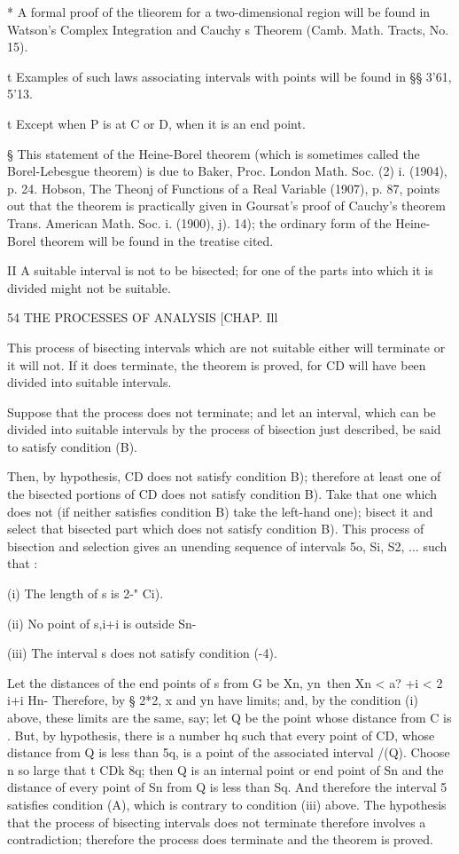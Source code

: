 * A formal proof of the tlieorem for a two-dimensional region will be
found in Watson's Complex Integration and Cauchy s Theorem (Camb.
Math. Tracts, No. 15).

t Examples of such laws associating intervals with points will be
found in §§ 3'61, 5'13.

t Except when P is at C or D, when it is an end point.

§ This statement of the Heine-Borel theorem (which is sometimes called
the Borel-Lebesgue theorem) is due to Baker, Proc. London Math. Soc.
(2) i. (1904), p. 24. Hobson, The Theonj of Functions of a Real
Variable (1907), p. 87, points out that the theorem is practically
given in Goursat's proof of Cauchy's theorem Trans. American Math.
Soc. i. (1900), j). 14); the ordinary form of the Heine-Borel theorem
will be found in the treatise cited.

II A suitable interval is not to be bisected; for one of the parts
into which it is divided might not be suitable.



54 THE PROCESSES OF ANALYSIS [CHAP. Ill

This process of bisecting intervals which are not suitable either will
terminate or it will not. If it does terminate, the theorem is proved,
for CD will have been divided into suitable intervals.

Suppose that the process does not terminate; and let an interval,
which can be divided into suitable intervals by the process of
bisection just described, be said to satisfy condition (B).

Then, by hypothesis, CD does not satisfy condition B); therefore at
least one of the bisected portions of CD does not satisfy condition
B). Take that one which does not (if neither satisfies condition B)
take the left-hand one); bisect it and select that bisected part
which does not satisfy condition B). This process of bisection and
selection gives an unending sequence of intervals 5o, Si, S2, ... such
that :

(i) The length of s is 2-" Ci).

(ii) No point of s,i+i is outside Sn-

(iii) The interval s does not satisfy condition (-4).

Let the distances of the end points of s from G be Xn, yn\ then Xn <
a? +i < 2 i+i Hn- Therefore, by § 2*2, x and yn have limits; and, by
the condition (i) above, these limits are the same, say; let Q be the
point whose distance from C is . But, by hypothesis, there is a number
hq such that every point of CD, whose distance from Q is less than 5q,
is a point of the associated interval /(Q). Choose n so large that t
CDk 8q; then Q is an internal point or end point of Sn and the
distance of every point of Sn from Q is less than Sq. And therefore
the interval 5 satisfies condition (A), which is contrary to condition
(iii) above. The hypothesis that the process of bisecting intervals
does not terminate therefore involves a contradiction; therefore the
process does terminate and the theorem is proved.

